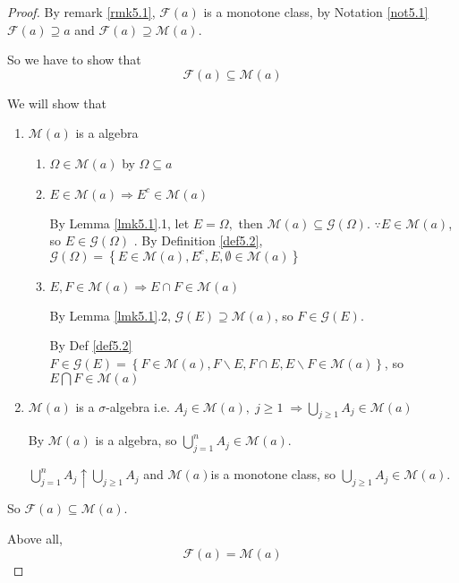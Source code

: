 \begin{proof}
	By remark \ref{rmk5.1}, $ \mathcal{F}(a) $ is a monotone class, by Notation \ref{not5.1} $ \mathcal{F}(a) \supseteq a $ and $ \mathcal{F}(a) \supseteq \mathcal{M}(a)$. 
	
	So we have to show that
	\begin{equation}
	\mathcal{F}(a) \subseteq \mathcal{M}(a)
	\label{eq5.12}
	\end{equation} 
	
	We will show that
	\begin{enumerate}
		\item $ \mathcal{M}(a) $ is a algebra
		\begin{enumerate}
			\item $\Omega  \in \mathcal{M}\left( a \right)$ by $ \Omega \subseteq a $
			\item $ E \in \mathcal{M}(a) \Rightarrow E^{c} \in \mathcal{M}(a) $
			
			By  Lemma \ref{lmk5.1}.1, let $ E = \Omega, $  then $ \mathcal{M}(a) \subseteq \mathcal{G}(\Omega) $. $ \because E \in \mathcal{M}(a) $, so $E \in \mathcal{G}(\Omega)$  . By  Definition \ref{def5.2}, $ \mathcal{G}\left( \Omega  \right) = \left\{ {E \in \mathcal{M}\left( a \right),{E^c},E,\emptyset  \in \mathcal{M}\left( a \right)} \right\} $
			\item $E,F \in \mathcal{M}\left( a \right) \Rightarrow E \cap F \in \mathcal{M}\left( a \right)$
			
			By  Lemma \ref{lmk5.1}.2, $\mathcal{G}\left( E \right) \supseteq \mathcal{M}\left( a \right)$, so $ F \in \mathcal{G}(E) $. 
			
			By Def \ref{def5.2} $F \in \mathcal{G}\left( E \right) = \left\{ {F \in \mathcal{M}\left( a \right),F\backslash E,F \cap E,E\backslash F \in \mathcal{M}\left( a \right)} \right\}$, so $ E \bigcap F \in \mathcal{M}(a) $
		\end{enumerate}
		\item $ \mathcal{M}(a) $ is a $ \sigma $-algebra i.e. ${A_j} \in \mathcal{M}\left( a \right),\;j \geqslant 1\; \Rightarrow \bigcup\limits_{j \geqslant 1} {{A_j}}  \in \mathcal{M}\left( a \right)$
		
		By $ \mathcal{M}(a) $ is a algebra, so $\bigcup\limits_{j = 1}^n {{A_j}}  \in \mathcal{M}\left( a \right)$.
		
		$\bigcup\limits_{j = 1}^n {{A_j}}  \uparrow \bigcup\limits_{j \geqslant 1} {{A_j}} $ and $ \mathcal{M}(a) $is a monotone class, so $\bigcup\limits_{j \geqslant 1} {{A_j}}  \in \mathcal{M}\left( a \right)$.
	\end{enumerate}
So $ \mathcal{F}(a) \subseteq \mathcal{M}(a) $.

Above all,
\begin{equation}
\mathcal{F}(a) =  \mathcal{M}(a)
\label{eq5.13}
\end{equation}
\end{proof}
